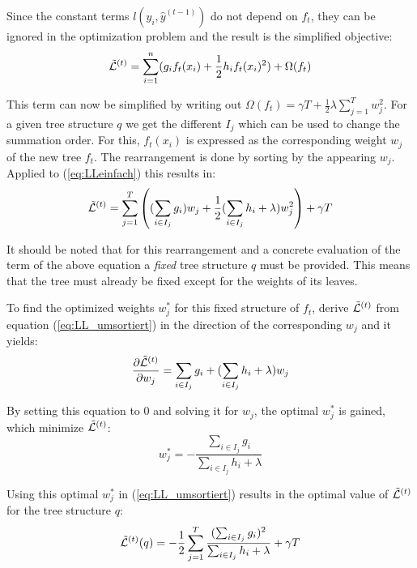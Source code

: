 Since the constant terms $l(y_i,\hat{y}^{(t-1)})$ do not depend on $f_t$, they can be ignored in the optimization problem and the result is the simplified objective:
\begin{equation} \label{eq:LLeinfach}
\tilde{\mathcal{L}}^{(t)} = \sum_{i=1}^{n}( g_if_t(x_i) + \frac{1}{2} h_i f_t(x_i)^2) + \Omega(f_t)
\end{equation}

This term can now be simplified by writing out $\Omega(f_t) = \gamma T + \frac{1}{2}\lambda \sum_{j=1}^{T} w_j^2$. For a given tree structure $q$ we get the different $I_j$ which can be used to change the summation order. For this, $f_t(x_i)$ is expressed as the corresponding weight $w_j$ of the new tree $f_t$. The rearrangement is done by sorting by the appearing $w_j$. Applied to (\ref{eq:LLeinfach}) this results in:
\begin{equation} \label{eq:LL_umsortiert}
\tilde{\mathcal{L}}^{(t)} = \sum_{j=1}^T\left( (\sum_{i \in I_j} g_i) w_j + \frac{1}{2} (\sum_{i \in I_j} h_i + \lambda)w_j^2 \right) + \gamma T
\end{equation}

It should be noted that for this rearrangement and a concrete evaluation of the term of the above equation a \textit{fixed} tree structure $q$ must be provided. This means that the tree must already be fixed except for the weights of its leaves.

To find the optimized weights $w^*_j$ for this fixed structure of $f_t$, derive $\tilde{\mathcal{L}}^{(t)}$ from equation (\ref{eq:LL_umsortiert}) in the direction of the corresponding $w_j$ and it yields:
\begin{equation} \label{eq:LL_ableitung}
\frac{\partial \tilde{\mathcal{L}}^{(t)}}{\partial w_j} = \sum_{i \in I_j} g_i + (\sum_{i \in I_j} h_i + \lambda)w_j
\end{equation}

By setting this equation to $0$ and solving it for $w_j$, the optimal $w^*_j$ is gained, which minimize $\tilde{\mathcal{L}}^{(t)}$:
\begin{equation} \label{eq:opt_w}
w_j^* = - \frac{\sum_{i \in I_j} g_i}{\sum_{i \in I_j} h_i + \lambda}
\end{equation}

Using this optimal $w_j^*$ in (\ref{eq:LL_umsortiert}) results in the optimal value of $\tilde{\mathcal{L}}^{(t)}$ for the tree structure $q$:
\begin{equation} \label{eq:entropy}
\tilde{\mathcal{L}}^{(t)} (q) = - \frac{1}{2} \sum_{j=1}^{T} \frac{(\sum_{i \in I_j} g_i)^2}{\sum_{i \in I_j} h_i + \lambda} + \gamma T
\end{equation}

